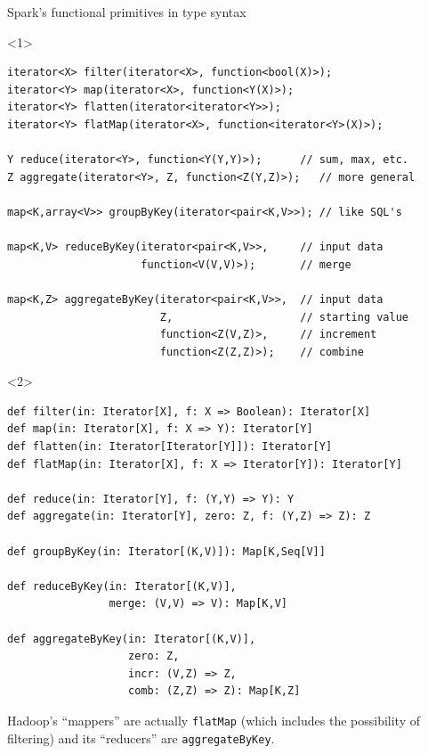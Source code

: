\documentclass{beamer}
\begin{document}
\begin{frame}[fragile]{Spark's functional primitives in  type syntax}
\small
\begin{onlyenv}<1>
\begin{verbatim}
iterator<X> filter(iterator<X>, function<bool(X)>);
iterator<Y> map(iterator<X>, function<Y(X)>);
iterator<Y> flatten(iterator<iterator<Y>>);
iterator<Y> flatMap(iterator<X>, function<iterator<Y>(X)>);

Y reduce(iterator<Y>, function<Y(Y,Y)>);      // sum, max, etc.
Z aggregate(iterator<Y>, Z, function<Z(Y,Z)>);   // more general

map<K,array<V>> groupByKey(iterator<pair<K,V>>); // like SQL's

map<K,V> reduceByKey(iterator<pair<K,V>>,     // input data
                     function<V(V,V)>);       // merge

map<K,Z> aggregateByKey(iterator<pair<K,V>>,  // input data
                        Z,                    // starting value
                        function<Z(V,Z)>,     // increment
                        function<Z(Z,Z)>);    // combine
\end{verbatim}
\end{onlyenv}
\begin{onlyenv}<2>
\begin{verbatim}
def filter(in: Iterator[X], f: X => Boolean): Iterator[X]
def map(in: Iterator[X], f: X => Y): Iterator[Y]
def flatten(in: Iterator[Iterator[Y]]): Iterator[Y]
def flatMap(in: Iterator[X], f: X => Iterator[Y]): Iterator[Y]

def reduce(in: Iterator[Y], f: (Y,Y) => Y): Y
def aggregate(in: Iterator[Y], zero: Z, f: (Y,Z) => Z): Z

def groupByKey(in: Iterator[(K,V)]): Map[K,Seq[V]]

def reduceByKey(in: Iterator[(K,V)],
                merge: (V,V) => V): Map[K,V]

def aggregateByKey(in: Iterator[(K,V)],
                   zero: Z,
                   incr: (V,Z) => Z,
                   comb: (Z,Z) => Z): Map[K,Z]
\end{verbatim}
\end{onlyenv}

\normalsize
Hadoop's ``mappers'' are actually {\tt flatMap} (which includes the possibility of filtering) and its ``reducers'' are {\tt aggregateByKey}.
\end{frame}
\end{document}
